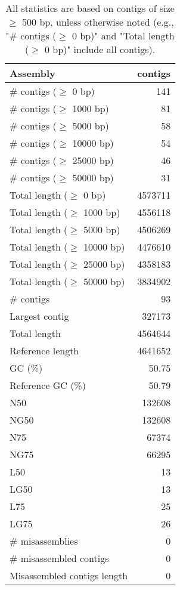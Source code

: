 \documentclass[12pt,a4paper]{article}
\begin{document}
\begin{table}[ht]
\begin{center}
\caption{All statistics are based on contigs of size $\geq$ 500 bp, unless otherwise noted (e.g., "\# contigs ($\geq$ 0 bp)" and "Total length ($\geq$ 0 bp)" include all contigs).}
\begin{tabular}{|l*{1}{|r}|}
\hline
Assembly & contigs \\ \hline
\# contigs ($\geq$ 0 bp) & 141 \\ \hline
\# contigs ($\geq$ 1000 bp) & 81 \\ \hline
\# contigs ($\geq$ 5000 bp) & 58 \\ \hline
\# contigs ($\geq$ 10000 bp) & 54 \\ \hline
\# contigs ($\geq$ 25000 bp) & 46 \\ \hline
\# contigs ($\geq$ 50000 bp) & 31 \\ \hline
Total length ($\geq$ 0 bp) & 4573711 \\ \hline
Total length ($\geq$ 1000 bp) & 4556118 \\ \hline
Total length ($\geq$ 5000 bp) & 4506269 \\ \hline
Total length ($\geq$ 10000 bp) & 4476610 \\ \hline
Total length ($\geq$ 25000 bp) & 4358183 \\ \hline
Total length ($\geq$ 50000 bp) & 3834902 \\ \hline
\# contigs & 93 \\ \hline
Largest contig & 327173 \\ \hline
Total length & 4564644 \\ \hline
Reference length & 4641652 \\ \hline
GC (\%) & 50.75 \\ \hline
Reference GC (\%) & 50.79 \\ \hline
N50 & 132608 \\ \hline
NG50 & 132608 \\ \hline
N75 & 67374 \\ \hline
NG75 & 66295 \\ \hline
L50 & 13 \\ \hline
LG50 & 13 \\ \hline
L75 & 25 \\ \hline
LG75 & 26 \\ \hline
\# misassemblies & 0 \\ \hline
\# misassembled contigs & 0 \\ \hline
Misassembled contigs length & 0 \\ \hline

\end{tabular}
\end{center}
\end{table}
\end{document}
